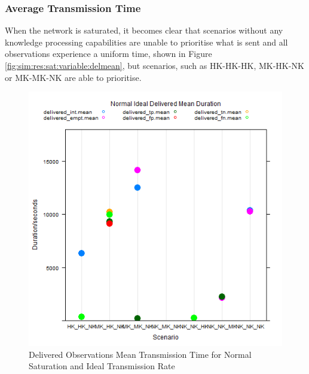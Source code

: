 \subsubsection{Average Transmission Time}
	When the network is saturated, it becomes clear that scenarios without any knowledge processing capabilities are unable to prioritise what is sent and all observations experience a uniform time, shown in Figure \ref{fig:sim:res:sat:variable:delmean}, but scenarios, such as HK-HK-HK, MK-HK-NK or MK-MK-NK are able to prioritise.
	\begin{figure}[H]
	\centering
	\includegraphics[width=\textwidth]{Chap7/figures/plots/normal_ideal/delivered_mean.png}
	\caption{Delivered Observations Mean Transmission Time for Normal Saturation and Ideal Transmission Rate}
	\label{fig:sim:res:norm:ideal:delmean}
	\end{figure}

